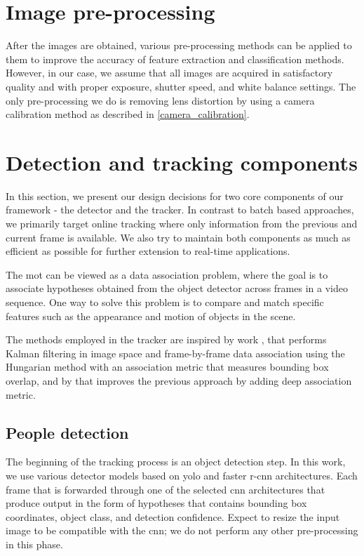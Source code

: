 \section{Image pre-processing}
    After the images are obtained, various pre-processing methods can be applied to them to improve the accuracy of feature extraction and classification methods. However, in our case, we assume that all images are acquired in satisfactory quality and with proper exposure, shutter speed, and white balance settings. The only pre-processing we do is removing lens distortion by using a camera calibration method as described in \ref{camera_calibration}.

\section{Detection and tracking components}
    In this section, we present our design decisions for two core components of our framework - the detector and the tracker. In contrast to batch based approaches, we primarily target online tracking where only information from the previous and current frame is available. We also try to maintain both components as much as efficient as possible for further extension to real-time applications.

    The \gls{mot} can be viewed as a data association problem, where the goal is to associate hypotheses obtained from the object detector across frames in a video sequence. One way to solve this problem is to compare and match specific features such as the appearance and motion of objects in the scene. 
    
    The methods employed in the tracker are inspired by work \cite{2016arXiv160502688short}, that performs Kalman filtering \cite{kalman1960new} in image space and frame-by-frame data association using the Hungarian method \cite{jonker1987shortest} with an association metric that measures bounding box overlap, and by \cite{wojke2017simple} that improves the previous approach by adding deep association metric.

    \subsection{People detection}
        The beginning of the tracking process is an object detection step. In this work, we use various detector models based on \gls{yolo} and \gls{faster r-cnn} architectures. Each frame that is forwarded through one of the selected \gls{cnn} architectures that produce output in the form of hypotheses that contains bounding box coordinates, object class, and detection confidence. Expect to resize the input image to be compatible with the \gls{cnn}; we do not perform any other pre-processing in this phase.
        
